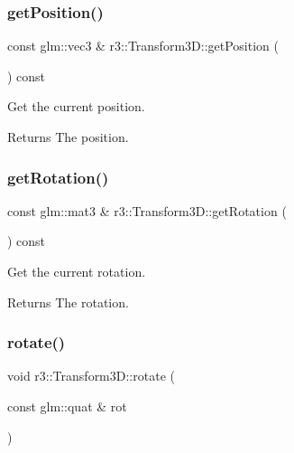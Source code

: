 \subsubsection{\texorpdfstring{get\+Position()}{getPosition()}}
{\footnotesize\ttfamily const glm\+::vec3 \& r3\+::\+Transform3\+D\+::get\+Position (\begin{DoxyParamCaption}{ }\end{DoxyParamCaption}) const}



Get the current position. 

\begin{DoxyReturn}{Returns}
The position. 
\end{DoxyReturn}
\mbox{\label{classr3_1_1_transform3_d_a1bad817e81d93f275ac71864fae763aa}} 
\subsubsection{\texorpdfstring{get\+Rotation()}{getRotation()}}
{\footnotesize\ttfamily const glm\+::mat3 \& r3\+::\+Transform3\+D\+::get\+Rotation (\begin{DoxyParamCaption}{ }\end{DoxyParamCaption}) const}



Get the current rotation. 

\begin{DoxyReturn}{Returns}
The rotation. 
\end{DoxyReturn}
\mbox{\label{classr3_1_1_transform3_d_aaf633209948d35ca4b90422614a84478}} 
\subsubsection{\texorpdfstring{rotate()}{rotate()}\hspace{0.1cm}{\footnotesize\ttfamily [1/2]}}
{\footnotesize\ttfamily void r3\+::\+Transform3\+D\+::rotate (\begin{DoxyParamCaption}\item[{const glm\+::quat \&}]{rot }\end{DoxyParamCaption})}



